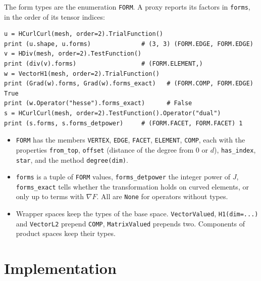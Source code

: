 \documentclass[10pt,a4paper]{article}
\newcommand{\code}[1]{\texttt{#1}}
\begin{document}
The form types are the enumeration \code{FORM}. A proxy reports its factors in \code{forms}, in the order of its tensor indices:
\begin{lstlisting}
u = HCurlCurl(mesh, order=2).TrialFunction()
print (u.shape, u.forms)              # (3, 3) (FORM.EDGE, FORM.EDGE)
v = HDiv(mesh, order=2).TestFunction()
print (div(v).forms)                  # (FORM.ELEMENT,)
w = VectorH1(mesh, order=2).TrialFunction()
print (Grad(w).forms, Grad(w).forms_exact)   # (FORM.COMP, FORM.EDGE) True
print (w.Operator("hesse").forms_exact)      # False
s = HCurlCurl(mesh, order=2).TestFunction().Operator("dual")
print (s.forms, s.forms_detpower)     # (FORM.FACET, FORM.FACET) 1
\end{lstlisting}
\begin{itemize}\setlength\itemsep{1pt}
\item \code{FORM} has the members \code{VERTEX}, \code{EDGE}, \code{FACET}, \code{ELEMENT}, \code{COMP}, each with the properties \code{from\_top}, \code{offset} (distance of the degree from $0$ or $d$), \code{has\_index}, \code{star}, and the method \code{degree(dim)}.
\item \code{forms} is a tuple of \code{FORM} values, \code{forms\_detpower} the integer power of $J$, \code{forms\_exact} tells whether the transformation holds on curved elements, or only up to terms with $\nabla F$. All are \code{None} for operators without types.
\item Wrapper spaces keep the types of the base space. \code{VectorValued}, \code{H1(dim=...)} and \code{VectorL2} prepend \code{COMP}, \code{MatrixValued} prepends two. Components of product spaces keep their types.
\end{itemize}

\section{Implementation}
\end{document}
